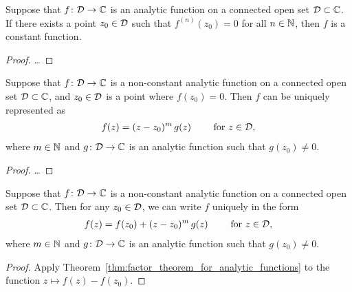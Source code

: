 \begin{lemma}
  \label{lem:no_vanishing_of_all_order_derivatives}
  Suppose that $f \colon \mathcal{D} \to \mathbb{C}$ is an analytic function
  on a connected open set $\mathcal{D} \subset \mathbb{C}$.
  If there exists a point $z_0 \in \mathcal{D}$
  such that $f^{(n)}(z_0) = 0$ for all $n \in \mathbb{N}$, then $f$ is a constant
  function.
\end{lemma}
\begin{proof}
  \ldots
\end{proof}

\begin{theorem}
  \label{thm:factor_theorem_for_analytic_functions}
  Suppose that $f \colon \mathcal{D} \to \mathbb{C}$ is a non-constant analytic function
  on a connected open set $\mathcal{D} \subset \mathbb{C}$, and $z_0 \in \mathcal{D}$
  is a point where $f(z_0) = 0$.
  Then $f$ can be uniquely represented as
  \begin{align*}
    f(z) = (z - z_0)^m \, g(z) \qquad \text{ for } z \in \mathcal{D} ,
  \end{align*}
  where $m \in \mathbb{N}$ and $g \colon \mathcal{D} \to \mathbb{C}$ is an analytic
  function such that $g(z_0) \ne 0$.
\end{theorem}
\begin{proof}
  \ldots
\end{proof}

\begin{corollary}
  \label{cor:analytic_local_representation}
  Suppose that $f \colon \mathcal{D} \to \mathbb{C}$ is a non-constant analytic function
  on a connected open set $\mathcal{D} \subset \mathbb{C}$.
  Then for any $z_0 \in \mathcal{D}$, we can write $f$ uniquely in the form
  \begin{align*}
    f(z) = f(z_0) + (z - z_0)^m \, g(z) \qquad \text{ for } z \in \mathcal{D} ,
  \end{align*}
  where $m \in \mathbb{N}$ and $g \colon \mathcal{D} \to \mathbb{C}$ is an analytic
  function such that $g(z_0) \ne 0$.
\end{corollary}
\begin{proof}
  Apply Theorem~\ref{thm:factor_theorem_for_analytic_functions} to the
  function $z \mapsto f(z) - f(z_0)$.
\end{proof}

